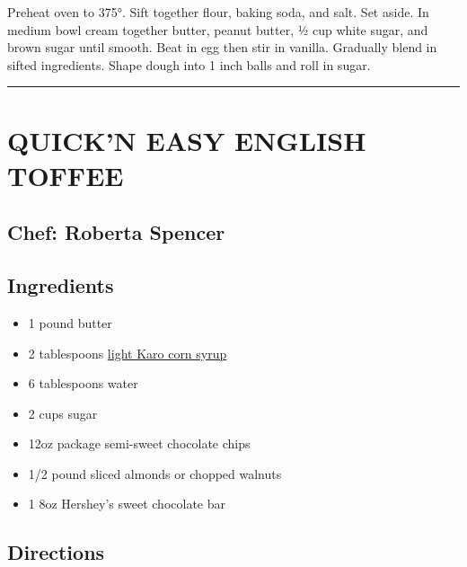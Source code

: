 \documentclass[
]{book}
\providecommand{\tightlist}{%
  \setlength{\itemsep}{0pt}\setlength{\parskip}{0pt}}
\begin{document}
Preheat oven to 375°. Sift together flour, baking soda, and salt. Set aside. In medium bowl cream together butter, peanut butter, ½ cup white sugar, and brown sugar until smooth. Beat in egg then stir in vanilla. Gradually blend in sifted ingredients. Shape dough into 1 inch balls and roll in sugar.

\begin{center}\rule{0.5\linewidth}{0.5pt}\end{center}

\hypertarget{quickn-easy-english-toffee}{%
\section*{QUICK'N EASY ENGLISH TOFFEE}\label{quickn-easy-english-toffee}}


\hypertarget{chef-roberta-spencer-37}{%
\subsection*{Chef: Roberta Spencer}\label{chef-roberta-spencer-37}}


\hypertarget{ingredients-104}{%
\subsection*{Ingredients}\label{ingredients-104}}


\begin{itemize}
\tightlist
\item
  1 pound butter
\item
  2 tablespoons \href{https://en.wikipedia.org/wiki/Corn_syrup}{light Karo corn syrup}
\item
  6 tablespoons water
\item
  2 cups sugar
\item
  12oz package semi-sweet chocolate chips
\item
  1/2 pound sliced almonds or chopped walnuts
\item
  1 8oz Hershey's sweet chocolate bar
\end{itemize}

\hypertarget{directions-104}{%
\subsection*{Directions}\label{directions-104}}
\end{document}

